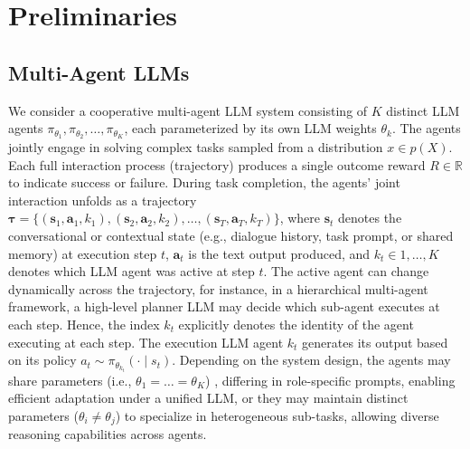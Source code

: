 \section{Preliminaries}
\label{sec:background}
\subsection{Multi-Agent LLMs}
We consider a cooperative multi-agent LLM system consisting of $K$ distinct LLM agents ${\pi_{\theta_1}, \pi_{\theta_2}, \dots, \pi_{\theta_K}}$, each parameterized by its own LLM weights $\theta_k$. The agents jointly engage in solving complex tasks sampled from a distribution $x\in p(X)$. Each full interaction process (trajectory) produces a single outcome reward $R \in \mathbb{R}$ to indicate success or failure. During task completion, the agents’ joint interaction unfolds as a trajectory $\bm{\tau} = \{(\bm{s}_1, \bm{a}_1, k_1), (\bm{s}_2, \bm{a}_2, k_2), \dots, (\bm{s}_T, \bm{a}_T, k_T)\}$, where $\bm{s}_t$ denotes the conversational or contextual state (e.g., dialogue history, task prompt, or shared memory) at execution step $t$, $\bm{a}_t$ is the text output produced, and $k_t \in {1,\dots,K}$ denotes which LLM agent was active at step $t$. The active agent can change dynamically across the trajectory, for instance, in a hierarchical multi-agent framework, a high-level planner LLM may decide which sub-agent executes at each step. Hence, the index $k_t$ explicitly denotes the identity of the agent executing at each step. The execution LLM agent $k_t$ generates its output based on its policy $a_t \sim \pi_{\theta_{k_t}}(\cdot \mid s_t)$. Depending on the system design, the agents may share parameters (i.e., $\theta_1 = \dots = \theta_K$) , differing in role-specific prompts, enabling efficient adaptation under a unified LLM, or they may maintain distinct parameters ($\theta_i \neq \theta_j$) to specialize in heterogeneous sub-tasks, allowing diverse reasoning capabilities across agents.

